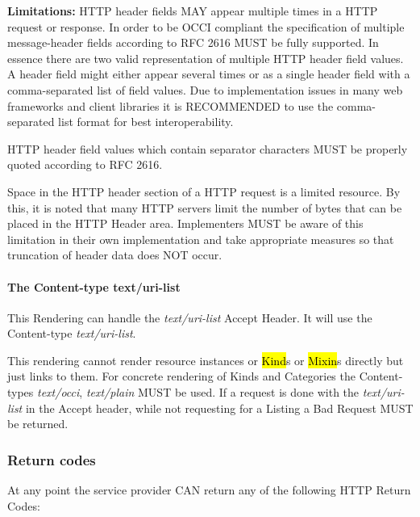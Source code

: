 \documentclass[10pt,a4paper]{article}
\begin{document}
\textbf{Limitations: } HTTP header fields MAY appear multiple times in
a HTTP request or response. In order to be OCCI compliant the
specification of multiple message-header fields according to RFC 2616
MUST be fully supported. In essence there are two valid representation
of multiple HTTP header field values. A header field might either
appear several times or as a single header field with a
comma-separated list of field values. Due to implementation issues in
many web frameworks and client libraries it is RECOMMENDED to use the
comma-separated list format for best interoperability.

HTTP header field values which contain separator characters MUST be
properly quoted according to RFC 2616.

Space in the HTTP header section of a HTTP request is a limited
resource. By this, it is noted that many HTTP servers limit the number
of bytes that can be placed in the HTTP Header area. Implementers MUST
be aware of this limitation in their own implementation and take
appropriate measures so that truncation of header data does NOT
occur.

\paragraph{The Content-type text/uri-list}
This Rendering can handle the \textit{text/uri-list} Accept Header. It
will use the Content-type \textit{text/uri-list}.

This rendering cannot render resource instances or \hl{Kind}s or
\hl{Mixin}s directly but just links to them. For concrete rendering of
Kinds and Categories the Content-types \textit{text/occi},
\textit{text/plain} MUST be used. If a request is done with the
\textit{text/uri-list} in the Accept header, while not requesting for
a Listing a Bad Request MUST be returned.

\subsubsection{Return codes}
\label{sec:return_codes}
At any point the service provider CAN return any of the following HTTP
Return Codes:
\end{document}
